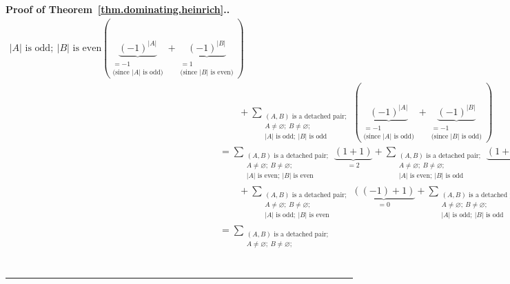 \documentclass[numbers=enddot,12pt,final,onecolumn,notitlepage]{scrartcl}%
\theoremstyle{definition}
\newenvironment{proof}[1][Proof]{\noindent\textbf{#1.} }{\ \rule{0.5em}{0.5em}}
\let\sumnonlimits\sum
\renewcommand{\sum}{\sumnonlimits\limits}
\newcommand{\abs}[1]{\left| #1 \right|}
\newcommand{\tup}[1]{\left( #1 \right)}
\begin{document}
\begin{proof}[Proof of Theorem~\ref{thm.dominating.heinrich}.]
\begin{align*}
{{                \abs{A} \text{ is odd};
                \ \abs{B} \text{ is even}}}
  \tup{\underbrace{\tup{-1}^{\abs{A}}}_{\substack{= -1 \\
               \text{(since } \abs{A} \text{ is odd)}}}
       + \underbrace{\tup{-1}^{\abs{B}}}_{\substack{= 1 \\
               \text{(since } \abs{B} \text{ is even)}}}} \\
& \qquad +  \sum_{\substack{\tup{A, B} \text{ is a detached pair}; \\
                A \neq \varnothing; \  B \neq \varnothing ; \\
                \abs{A} \text{ is odd};
                \ \abs{B} \text{ is odd}}}
  \tup{\underbrace{\tup{-1}^{\abs{A}}}_{\substack{= -1 \\
               \text{(since } \abs{A} \text{ is odd)}}}
       + \underbrace{\tup{-1}^{\abs{B}}}_{\substack{= -1 \\
               \text{(since } \abs{B} \text{ is odd)}}}} \\
&= \sum_{\substack{\tup{A, B} \text{ is a detached pair}; \\
                A \neq \varnothing; \  B \neq \varnothing ; \\
                \abs{A} \text{ is even};
                \ \abs{B} \text{ is even}}}
   \underbrace{\tup{1 + 1}}_{= 2}
+ \sum_{\substack{\tup{A, B} \text{ is a detached pair}; \\
                A \neq \varnothing; \  B \neq \varnothing ; \\
                \abs{A} \text{ is even};
                \ \abs{B} \text{ is odd}}}
   \underbrace{\tup{1 + \tup{-1}}}_{= 0} \\
&\qquad + \sum_{\substack{\tup{A, B} \text{ is a detached pair}; \\
                A \neq \varnothing; \  B \neq \varnothing ; \\
                \abs{A} \text{ is odd};
                \ \abs{B} \text{ is even}}}
   \underbrace{\tup{\tup{-1} + 1}}_{= 0}
+ \sum_{\substack{\tup{A, B} \text{ is a detached pair}; \\
                A \neq \varnothing; \  B \neq \varnothing ; \\
                \abs{A} \text{ is odd};
                \ \abs{B} \text{ is odd}}}
   \underbrace{\tup{\tup{-1} + \tup{-1}}}_{= -2} \\
&= \sum_{\substack{\tup{A, B} \text{ is a detached pair}; \\
                A \neq \varnothing; \  B \neq \varnothing ; \\
}}
\end{align*}
\end{proof}
\end{document}
